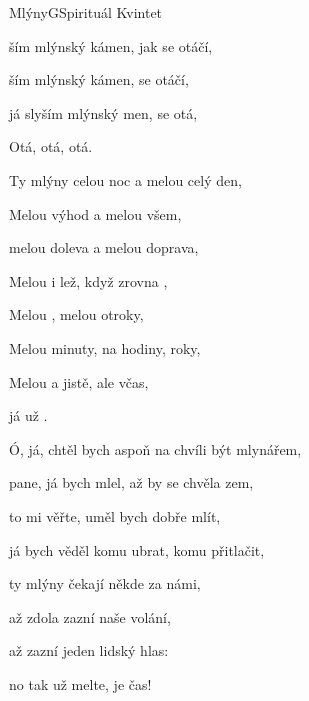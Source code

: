 \begin{song}{Mlýny}{G}{Spirituál Kvintet}

\begin{SBChorus}

ším mlýnský kámen, jak se otáčí,

ším mlýnský kámen,  se otáčí,

já slyším mlýnský men,  se otá,

Otá, otá, otá.

\end{SBChorus}

\begin{SBVerse}

Ty mlýny  celou noc a melou celý den,

Melou  výhod a melou  všem,

melou doleva a melou doprava,

Melou  i lež, když zrovna ,

Melou , melou otroky,

Melou  minuty, na hodiny,  roky,

Melou  a jistě, ale  včas,

já už   .

\end{SBVerse}

\begin{SBChorus}

\end{SBChorus}

\begin{SBVerse}

Ó, já, chtěl bych aspoň na chvíli být mlynářem,

pane, já bych mlel, až by se chvěla zem,

to mi věřte, uměl bych dobře mlít,

já bych věděl komu ubrat, komu přitlačit,

ty mlýny čekají někde za námi,

až zdola zazní naše volání,

až zazní jeden lidský hlas:

no tak už melte, je čas!

\end{SBVerse}

\begin{SBChorus}

\end{SBChorus}

\end{song}

\clearpage
